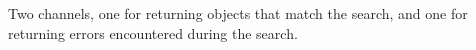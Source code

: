 Two channels, one for returning objects that match the search, and one for
returning errors encountered during the search.
